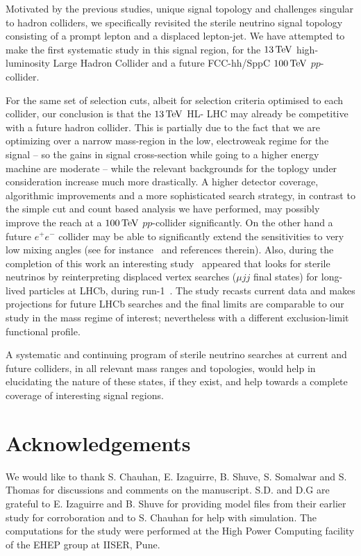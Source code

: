 \documentclass[reprint,doublecolumn,secnumarabic,amssymb, amsmath, aps,nofootinbib,superscriptaddress]{revtex4-1}
\newcommand{\Cit}[1]{~\cite{#1}}
\begin{document}
Motivated by the previous studies, unique signal topology and challenges singular to hadron colliders, we specifically revisited the sterile neutrino signal topology consisting of a prompt lepton and a displaced lepton-jet. We have attempted to make the first systematic study in this signal region, for the $13\,\rm{TeV}$ high-luminosity Large Hadron Collider and a future FCC-hh/SppC $100\,\rm{TeV}$ $pp$-collider. 

For the same set of selection cuts, albeit for selection criteria optimised to each collider, our conclusion is that the $13\,\rm{TeV}$ HL- LHC may already be competitive with a future hadron collider. This is partially due to the fact that we are optimizing over a narrow mass-region in the low, electroweak regime for the signal -- so the gains in signal cross-section while going to a higher energy machine are moderate -- while the relevant backgrounds for the toplogy under consideration increase much more drastically.  A higher detector coverage, algorithmic improvements and a more sophisticated search strategy, in contrast to the simple cut and count based analysis we have performed, may possibly improve the reach at a $100\,\rm{TeV}$ $pp$-collider significantly. On the other hand a future $e^+e^-$ collider may be able to significantly extend the sensitivities to very low mixing angles (see for instance\Cit{Antusch:2016ejd} and references therein). Also, during the completion of this work an interesting study\Cit{Antusch:2017hhu} appeared that looks for sterile neutrinos by reinterpreting displaced vertex searches ($\mu j j$ final states) for long-lived particles at LHCb, during run-1\Cit{Aaij:2016xmb}. The study recasts current data and makes projections for future LHCb searches and the final limits are comparable to our study in the mass regime of interest; nevertheless with a different exclusion-limit functional profile.

A systematic and continuing program of sterile neutrino searches at current and future colliders, in all relevant mass ranges and topologies, would help in elucidating the nature of these states, if they exist, and help towards a complete coverage of interesting signal regions.

\section*{Acknowledgements}
We would like to thank S. Chauhan, E. Izaguirre, B. Shuve, S. Somalwar and S. Thomas for discussions and comments on the manuscript. S.D. and D.G are grateful to E. Izaguirre and B. Shuve for providing model files from their earlier study for corroboration and to S. Chauhan for help with simulation. The computations for the study were performed at the High Power Computing facility of the EHEP group at IISER, Pune.



\end{document}
